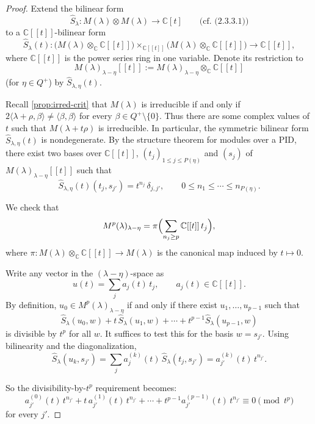 \documentclass[12pt]{article}
\begin{document}
\begin{proof}
Extend the bilinear form
\[
\widehat{S}_\lambda : M(\lambda) \otimes M(\lambda) \to \mathbb{C}[t]
\qquad \text{(cf.~(2.3.3.1))}
\]
to a $\mathbb{C}[[t]]$-bilinear form
\[
\widehat{S}_\lambda(t) :
\bigl(M(\lambda) \otimes_{\mathbb{C}} \mathbb{C}[[t]]\bigr)
\times_{\mathbb{C}[[t]]}
\bigl(M(\lambda) \otimes_{\mathbb{C}} \mathbb{C}[[t]]\bigr)
\longrightarrow \mathbb{C}[[t]],
\]
where $\mathbb{C}[[t]]$ is the power series ring in one variable.
Denote its restriction to 
\[M(\lambda)_{\lambda-\eta}[[t]]
:= M(\lambda)_{\lambda-\eta} \otimes_{\mathbb{C}} \mathbb{C}[[t]]\]
(for $\eta \in Q^+$) by $\widehat{S}_{\lambda,\eta}(t)$.

\medskip
Recall \ref{prop:irred-crit} that $M(\lambda)$ is irreducible if and only if $2\langle \lambda + \rho, \beta \rangle \neq \langle \beta, \beta \rangle$ for every $\beta \in Q^+ \setminus \{0\}$.
Thus there are some complex values of $t$
such that $M(\lambda + t\rho)$ is irreducible. In particular, the symmetric
bilinear form $\widehat{S}_{\lambda,\eta}(t)$ is nondegenerate.
By the structure theorem for modules over a PID,
there exist two bases over $\mathbb{C}[[t]]$,
$(t_j)_{1\le j \le P(\eta)}$ and $(s_j)$
of $M(\lambda)_{\lambda-\eta}[[t]]$ such that
\begin{equation}
\widehat{S}_{\lambda,\eta}(t)(t_j, s_{j'}) = t^{n_j}\,\delta_{j,j'},
\qquad
0 \le n_1 \le \cdots \le n_{P(\eta)}.
\end{equation}

We check that 
\begin{equation}
M^p(\lambda)_{\lambda-\eta}
= \pi\Bigl(
\sum_{n_j \ge p} \mathbb{C}[[t]]\,t_j
\Bigr),
\end{equation}
where $\pi : M(\lambda)\otimes_{\mathbb{C}}\mathbb{C}[[t]] \to M(\lambda)$
is the canonical map induced by $t \mapsto 0$.

Write any vector in the $(\lambda-\eta)$-space as
\[u(t)=\sum_j a_j(t)\,t_j,\qquad a_j(t)\in\mathbb{C}[[t]].\] 
By definition, $u_0\in M^p(\lambda)_{\lambda-\eta}$ if and only if there exist $u_1,\dots,u_{p-1}$ such that
\[\widehat{S}_\lambda(u_0,w)+t\,\widehat{S}_\lambda(u_1,w)+\cdots+t^{p-1}\widehat{S}_\lambda(u_{p-1},w)\]
is divisible by $t^p$ for all $w$. It suffices to test this for the basis $w=s_{j'}$. Using bilinearity and the diagonalization,
\[\widehat{S}_\lambda(u_k,s_{j'}) = \sum_j a_j^{(k)}(t)\,\widehat{S}_\lambda(t_j,s_{j'}) = a_{j'}^{(k)}(t)\,t^{n_{j'}}.\]

So the divisibility-by-$t^p$ requirement becomes:
\[a_{j'}^{(0)}(t)\,t^{n_{j'}}+t\,a_{j'}^{(1)}(t)\,t^{n_{j'}}+\cdots+t^{p-1}a_{j'}^{(p-1)}(t)\,t^{n_{j'}} \equiv 0 \pmod{t^p}\]
for every $j'$.


\end{proof}
\end{document}
